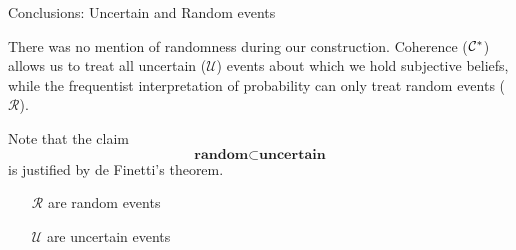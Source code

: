 \begin{frame}{Conclusions: Uncertain and Random events}
\begin{minipage}{\linewidth}
\begin{minipage}{0.6\linewidth}
\begin{minipage}{\linewidth}
There was no mention of randomness during our construction. Coherence ($\mathcal{C}^*$) allows us to treat all uncertain ($\mathcal{U}$) events about which we hold subjective beliefs, while the frequentist interpretation of probability can only treat random events ($\mathcal{R}$).
\end{minipage}

\vfill

\bigskip

\begin{minipage}{\linewidth}
\begingroup
\setlength{\abovedisplayskip}{2pt}
\setlength{\belowdisplayskip}{2pt}
Note that the claim
$$\textbf{random}\subset\textbf{uncertain}$$
is justified  by de Finetti's theorem.
\endgroup
\end{minipage}
\end{minipage}
\hfill
\begin{minipage}{0.35\linewidth}
\centering
\begin{minipage}{\linewidth}
\end{minipage}
\hfill
\bigskip

\begin{minipage}{\linewidth}
\begin{itemize}
\item[$\mathcal{R}$] are random events\\
\item[$\mathcal{U}$] are uncertain events
\end{itemize}
\end{minipage}
\end{minipage}
\end{minipage}
\end{frame}


\grid
